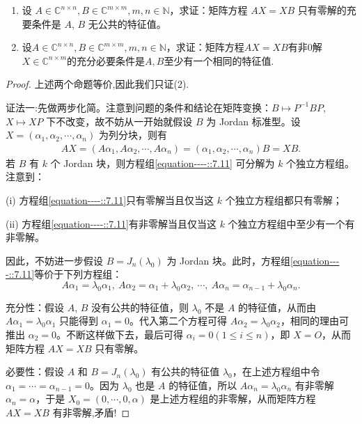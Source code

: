\documentclass[../../main.tex]{subfiles}%
\begin{document}
\begin{proposition}[$AX=BX$经典结论]\label{proposition:AX-XB线性映射相关等价条件--(1)}
\begin{enumerate}[(1)]
\item 设 $A\in\mathbb{C}^{n\times n}, B\in\mathbb{C}^{m\times m}, m,n\in\mathbb{N}$，求证：矩阵方程 $AX = XB$ 只有零解的充要条件是 $A$, $B$ 无公共的特征值。

\item 设$A\in\mathbb{C}^{n\times n}, B\in\mathbb{C}^{m\times m}, m,n\in\mathbb{N}$，求证：矩阵方程$AX = XB$有非$0$解$X\in\mathbb{C}^{n\times m}$的充分必要条件是$A,B$至少有一个相同的特征值. 
\end{enumerate}
\end{proposition}
\begin{proof}
上述两个命题等价,因此我们只证(2).

{\color{blue} 证法一:}先做两步化简。注意到问题的条件和结论在矩阵变换：$B \mapsto P^{-1}BP$, $X \mapsto XP$ 下不改变，故不妨从一开始就假设 $B$ 为 Jordan 标准型。设 $X = (\alpha_1, \alpha_2, \cdots, \alpha_n)$ 为列分块，则有
\begin{align}
AX = (A\alpha_1, A\alpha_2, \cdots, A\alpha_n) = (\alpha_1, \alpha_2, \cdots, \alpha_n)B = XB. \label{equation----::7.11}
\end{align}
若 $B$ 有 $k$ 个 Jordan 块，则方程组\eqref{equation----::7.11} 可分解为 $k$ 个独立方程组。注意到：

(i) 方程组\eqref{equation----::7.11}只有零解当且仅当这 $k$ 个独立方程组都只有零解；

(ii) 方程组\eqref{equation----::7.11}有非零解当且仅当这 $k$ 个独立方程组中至少有一个有非零解。

因此，不妨进一步假设 $B = J_n(\lambda_0)$ 为 Jordan 块。此时，方程组\eqref{equation----::7.11}等价于下列方程组：
\[
A\alpha_1 = \lambda_0\alpha_1,~ A\alpha_2 = \alpha_1 + \lambda_0\alpha_2,~ \cdots,~ A\alpha_n = \alpha_{n - 1} + \lambda_0\alpha_n.
\]

{\heiti 充分性：}假设 $A$, $B$ 没有公共的特征值，则 $\lambda_0$ 不是 $A$ 的特征值，从而由 $A\alpha_1 = \lambda_0\alpha_1$ 只能得到 $\alpha_1 = 0$。代入第二个方程可得 $A\alpha_2 = \lambda_0\alpha_2$，相同的理由可推出 $\alpha_2 = 0$。不断这样做下去，最后可得 $\alpha_i = 0 (1 \leqslant  i \leqslant  n)$，即 $X = O$，从而矩阵方程 $AX = XB$ 只有零解。

{\heiti 必要性：}假设 $A$ 和 $B = J_n(\lambda_0)$ 有公共的特征值 $\lambda_0$，在上述方程组中令 $\alpha_1 = \cdots = \alpha_{n - 1} = 0$。因为 $\lambda_0$ 也是 $A$ 的特征值，所以 $A\alpha_n = \lambda_0\alpha_n$ 有非零解 $\alpha_n = \alpha$，于是 $X_0 = (0, \cdots, 0, \alpha)$ 是上述方程组的非零解，从而矩阵方程 $AX = XB$ 有非零解,矛盾!


\end{proof}
\end{document}
